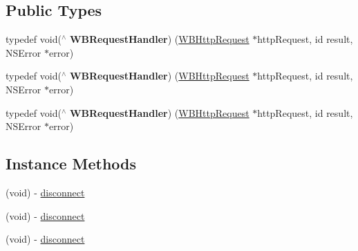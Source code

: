 \subsection*{Public Types}
\begin{DoxyCompactItemize}
\item 
\mbox{\label{interface_w_b_http_request_a328de79e37c68b7ea2990053682154a8}} 
typedef void($^\wedge$ {\bfseries W\+B\+Request\+Handler}) (\mbox{\hyperlink{interface_w_b_http_request}{W\+B\+Http\+Request}} $\ast$http\+Request, id result, N\+S\+Error $\ast$error)
\item 
\mbox{\label{interface_w_b_http_request_a328de79e37c68b7ea2990053682154a8}} 
typedef void($^\wedge$ {\bfseries W\+B\+Request\+Handler}) (\mbox{\hyperlink{interface_w_b_http_request}{W\+B\+Http\+Request}} $\ast$http\+Request, id result, N\+S\+Error $\ast$error)
\item 
\mbox{\label{interface_w_b_http_request_a328de79e37c68b7ea2990053682154a8}} 
typedef void($^\wedge$ {\bfseries W\+B\+Request\+Handler}) (\mbox{\hyperlink{interface_w_b_http_request}{W\+B\+Http\+Request}} $\ast$http\+Request, id result, N\+S\+Error $\ast$error)
\end{DoxyCompactItemize}
\subsection*{Instance Methods}
\begin{DoxyCompactItemize}
\item 
(void) -\/ \mbox{\hyperlink{interface_w_b_http_request_a387faed5b06844181d05a6de71d05932}{disconnect}}
\item 
(void) -\/ \mbox{\hyperlink{interface_w_b_http_request_a387faed5b06844181d05a6de71d05932}{disconnect}}
\item 
(void) -\/ \mbox{\hyperlink{interface_w_b_http_request_a387faed5b06844181d05a6de71d05932}{disconnect}}
\end{DoxyCompactItemize}
